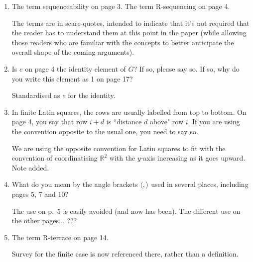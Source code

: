 \documentclass[12pt,a4paper]{article}
\newcommand{\R}{\mathbb{R}}
\newenvironment{QandA}{\begin{enumerate}[label=\bfseries\alph*.]\bfseries}
                      {\end{enumerate}}
\newenvironment{answered}{\par\normalfont}{}
\begin{document}
\begin{QandA}

\item
The term sequenceability on page 3.  The term R-sequencing on page 4.

\begin{answered}
The terms are in scare-quotes, intended to indicate that it's not required that the reader has to understand them at this point in the paper (while allowing those readers who are familiar with the concepts to better anticipate the overall shape of the coming arguments).
\end{answered}


\item 
Is $e$ on page 4 the identity element of $G$? If so, please say so. If so, why do you write this element as 1 on page 17?

\begin{answered}
Standardised as $e$ for the identity.
\end{answered}

\item
In finite Latin squares, the rows are usually labelled from top to bottom. On page 4, you say that row $i + d$ is ``distance $d$ above" row $i$. If you are using the convention opposite to the usual one, you need to say so.

\begin{answered}
We are using the opposite convention for Latin squares to fit with the convention of coordinatising $\R^2$ with the $y$-axis increasing as it goes upward.  Note added.
\end{answered}

\item
What do you mean by the angle brackets $\langle, \rangle$ used in several places, including pages 5, 7 and 10? %

\begin{answered}
The use on p.~5 is easily avoided (and now has been).  The different use on the other pages...  ???

\end{answered}

\item
The term R-terrace on page 14.

\begin{answered}
Survey for the finite case is now referenced there, 
rather than a definition.
\end{answered}

\end{QandA}
\end{document}
